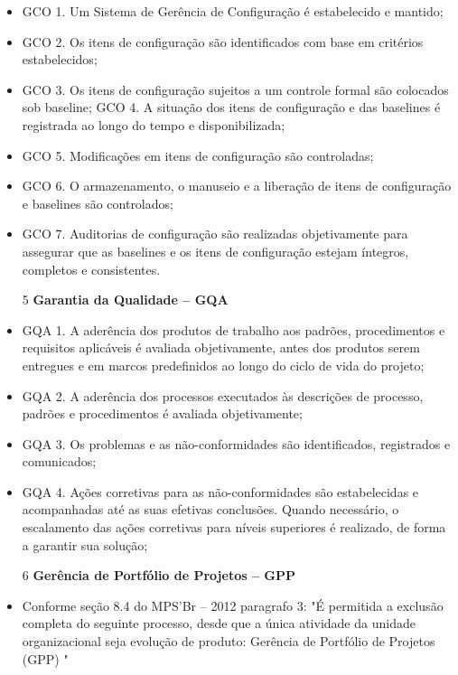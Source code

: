 \documentclass[	DIV=calc,%
							paper=a4,%
							fontsize=12pt,%
							onecolumn]{scrartcl}	 					%
\begin{document}
\begin{itemize}
\item GCO 1. Um Sistema de Gerência de Configuração é estabelecido e mantido; 
\item GCO 2. Os itens de configuração são identificados com base em critérios estabelecidos; 
\item GCO 3. Os itens de configuração sujeitos a um controle formal são colocados sob baseline; GCO 4. A situação dos itens de configuração e das baselines é registrada ao longo do tempo e disponibilizada; 
\item GCO 5. Modificações em itens de configuração são controladas; 
\item GCO 6. O armazenamento, o manuseio e a liberação de itens de configuração e baselines são controlados; 
\item GCO 7. Auditorias de configuração são realizadas objetivamente para assegurar que as baselines e os itens de configuração estejam íntegros, completos e consistentes.

\item[5] {\textbf{Garantia da Qualidade – GQA}}

\item GQA 1. A aderência dos produtos de trabalho aos padrões, procedimentos e requisitos aplicáveis é avaliada objetivamente, antes dos produtos serem entregues e em marcos predefinidos ao longo do ciclo de vida do projeto; 
\item GQA 2. A aderência dos processos executados às descrições de processo, padrões e procedimentos é avaliada objetivamente; 
\item GQA 3. Os problemas e as não-conformidades são identificados, registrados e comunicados; 
\item GQA 4. Ações corretivas para as não-conformidades são estabelecidas e acompanhadas até as suas efetivas conclusões. Quando necessário, o escalamento das ações corretivas para níveis superiores é realizado, de forma a garantir sua solução;

\item[6] {\textbf{Gerência de Portfólio de Projetos – GPP}}

\item Conforme seção 8.4 do MPS’Br – 2012 paragrafo 3: 
"É permitida a exclusão completa do seguinte processo, desde que a única atividade
da unidade organizacional seja evolução de produto:
Gerência de Portfólio de Projetos (GPP) "


\end{itemize}
\end{document}
